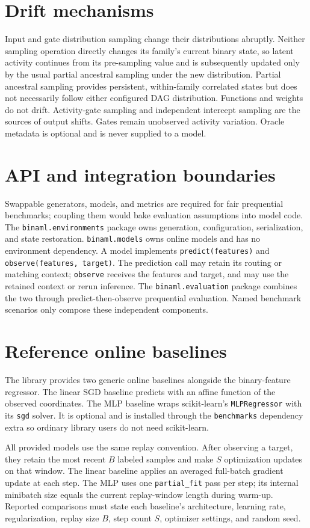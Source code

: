 \documentclass[11pt]{article}
\begin{document}
\section{Drift mechanisms}
Input and gate distribution sampling change their distributions abruptly.
Neither sampling operation directly changes its family's current binary state,
so latent activity continues from its pre-sampling value and is subsequently
updated only by the usual partial ancestral sampling under the new
distribution.  Partial ancestral sampling provides persistent,
within-family correlated states but does not necessarily follow either
configured DAG distribution.  Functions and weights do not drift.
Activity-gate sampling and independent intercept sampling are the sources of output
shifts.
Gates remain unobserved activity variation.  Oracle metadata is optional and
is never supplied to a model.

\section{API and integration boundaries}
Swappable generators, models, and metrics are required for fair prequential
benchmarks; coupling them would bake evaluation assumptions into model code.
The \texttt{binaml.environments} package owns generation, configuration,
serialization, and state restoration.  \texttt{binaml.models} owns online
models and has no environment dependency.  A model implements
\texttt{predict(features)} and \texttt{observe(features, target)}.  The
prediction call may retain its routing or matching context; \texttt{observe}
receives the features and target, and may use the retained context or rerun
inference.  The \texttt{binaml.evaluation}
package combines the two through predict-then-observe prequential evaluation.
Named benchmark scenarios only compose these
independent components.

\section{Reference online baselines}
The library provides two generic online baselines alongside the binary-feature
regressor.  The linear SGD baseline predicts with an affine function of the
observed coordinates.  The MLP baseline wraps scikit-learn's
\texttt{MLPRegressor} with its \texttt{sgd} solver.  It is optional and is
installed through the \texttt{benchmarks} dependency extra so ordinary library
users do not need scikit-learn.

All provided models use the same replay convention.  After observing a target,
they retain the most recent $B$ labeled samples and make $S$ optimization
updates on that window.  The linear baseline applies an averaged full-batch
gradient update at each step.  The MLP uses one \texttt{partial\_fit} pass per
step; its internal minibatch size equals the current replay-window length
during warm-up.  Reported comparisons must state each baseline's architecture,
learning rate, regularization, replay size $B$, step count $S$, optimizer
settings, and random seed.
\end{document}
